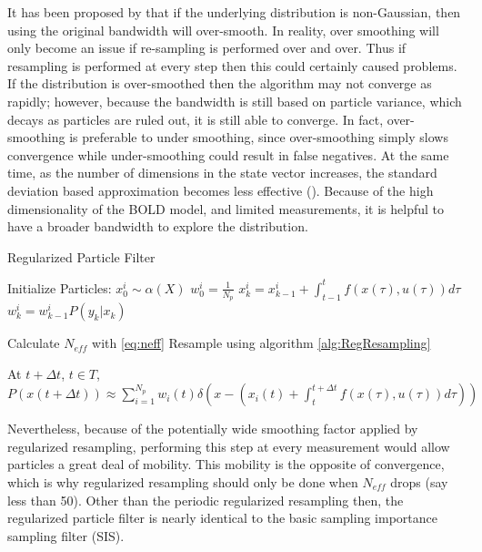 It has been proposed by \cite{Hurzeler1998} that if the underlying 
distribution is non-Gaussian, then using the original bandwidth will over-smooth. 
In reality, over smoothing
will only become an issue if re-sampling is performed over and over. Thus
if
resampling is performed at every step then this could certainly caused problems.
If the distribution is over-smoothed then the algorithm may not converge as rapidly;
however, because the bandwidth is still based on particle variance, which decays as 
particles are ruled out, it is still able to converge. In fact, over-smoothing is preferable
to under smoothing, since over-smoothing simply slows convergence while 
under-smoothing could result in false negatives.
At the same time, as the number of dimensions in the state vector 
increases, the standard deviation based approximation becomes less effective
 (\cite{Arulampalam2002a}). Because of the high dimensionality of the BOLD model,
and limited measurements, it is helpful to have a broader bandwidth to explore the distribution. 

\begin{algorithm}
\caption{Regularized Particle Filter}
\begin{algorithmic}
\STATE Initialize Particles:
    \STATE $x^i_0  \sim \alpha(X)$
    \STATE $w^i_0 = \frac{1}{N_p}$
\ENDFOR
{}
        \STATE $x^i_k = x^i_{k-1} + \int_{t-1}^t f(x(\tau), u(\tau)) d\tau $
        \STATE $w^i_k = w^i_{k-1}P(y_k | x_k)$
    \ENDFOR

    \STATE Calculate $N_{eff}$ with \autoref{eq:neff}
        \STATE Resample using algorithm \autoref{alg:RegResampling}
    \ENDIF
\ENDFOR

\STATE At $t + \Delta t$, $t \in T$, $P(x(t+\Delta t)) \approx 
\sum_{i=1}^{N_p} w_i(t)\delta\left(x - (x_i(t) + \int_t^{t+\Delta t} f(x(\tau), u(\tau)) d\tau) \right)$
 \end{algorithmic}
 \end{algorithm}

Nevertheless, because 
of the potentially wide smoothing factor applied by regularized resampling, performing this
step at every measurement would allow particles a great deal of mobility. This mobility is
the opposite of convergence, which is why regularized resampling should only be done when
$N_{eff}$ drops (say less than 50). Other than the periodic regularized
resampling then, the regularized particle filter is nearly identical to the basic sampling
importance sampling filter (SIS). 

